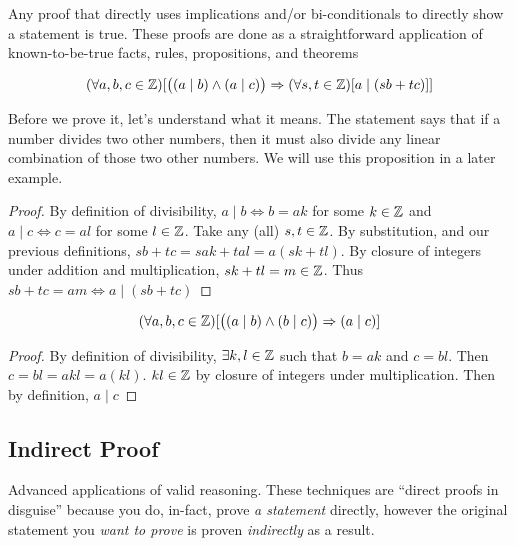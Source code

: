 \documentclass[main.tex]{subfiles}
\begin{document}
\begin{defn}
	Any proof that directly uses implications and/or bi-conditionals to directly show a statement is true. These proofs are done as a straightforward application of known-to-be-true facts, rules, propositions, and theorems
\end{defn}

\begin{prop}\label{prop:3.x-lin-combo-div}
	\[(\forall a,b,c \in \mathbb{Z})[\big((a \mid b) \land (a \mid c)\big) \Rightarrow (\forall s,t \in \mathbb{Z})[a \mid (sb + tc)]]\]
\end{prop}

Before we prove it, let's understand what it means. The statement says that if a number divides two other numbers, then it must also divide any linear combination of those two other numbers. We will use this proposition in a later example.

\begin{proof}
	By definition of divisibility, \(a \mid b \Leftrightarrow b = ak\) for some \(k \in \mathbb{Z}\) and \(a \mid c \Leftrightarrow c = al\) for some \(l \in \mathbb{Z}\). Take any (all) \(s,t \in \mathbb{Z}\). By substitution, and our previous definitions, \(sb + tc = sak + tal = a(sk + tl)\). By closure of integers under addition and multiplication, \(sk + tl = m \in \mathbb{Z}\). Thus \(sb + tc = am \Leftrightarrow a \mid (sb + tc)\)
\end{proof}

\begin{prop}
	\[(\forall a,b,c \in \mathbb{Z})[\big((a \mid b) \land (b \mid c)\big) \Rightarrow (a \mid c)]\]
\end{prop}

\begin{proof}
	By definition of divisibility, \(\exists k,l \in \mathbb{Z}\) such that \(b = ak\) and \(c = bl\). Then \(c = bl = akl = a(kl)\). \(kl \in \mathbb{Z}\) by closure of integers under multiplication. Then by definition, \(a \mid c\)
\end{proof}

\subsection{Indirect Proof}

Advanced applications of valid reasoning. These techniques are ``direct proofs in disguise'' because you do, in-fact, prove \textit{a statement} directly, however the original statement you \textit{want to prove} is proven \textit{indirectly} as a result.
\end{document}
